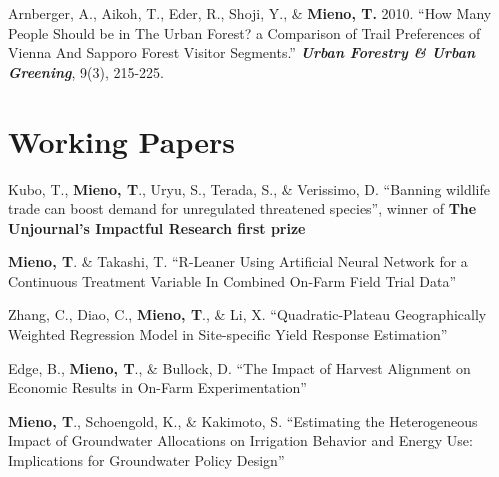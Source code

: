 \documentclass[10pt,margin,line]{res}
\newenvironment{list1}{
  \begin{list}{\ding{113}}{%
      \setlength{\itemsep}{0in}
      \setlength{\parsep}{0in} \setlength{\parskip}{0in}
      \setlength{\topsep}{0in} \setlength{\partopsep}{0in}
      \setlength{\leftmargin}{0.17in}}}{\end{list}}
\begin{document}
\begin{resume}
\begin{list1}
\item[] Arnberger, A., Aikoh, T., Eder, R., Shoji, Y., \& \textbf{Mieno, T.} 2010. ``How Many People Should be in The Urban Forest? a Comparison of Trail Preferences of Vienna And Sapporo Forest Visitor Segments.'' \textbf{\textit{Urban Forestry \& Urban Greening}}, 9(3), 215-225.
\end{list1}


\section{\sc Working Papers}

\begin{list1}

\item[] Kubo, T., \textbf{Mieno, T}., Uryu, S., Terada, S., \& Verissimo, D. ``Banning wildlife trade can boost demand for unregulated threatened species'', winner of \textbf{The Unjournal's Impactful Research first prize}
\vspace*{0.3cm}

\item[] \textbf{Mieno, T}. \& Takashi, T. ``R-Leaner Using Artificial Neural Network for a Continuous Treatment Variable In Combined On-Farm Field Trial Data''
\vspace*{0.3cm}

\item[] Zhang, C., Diao, C., \textbf{Mieno, T}., \& Li, X. ``Quadratic-Plateau Geographically Weighted Regression Model in Site-specific Yield Response Estimation''
\vspace*{0.3cm}

\item[] Edge, B., \textbf{Mieno, T}., \& Bullock, D. ``The Impact of Harvest Alignment on Economic Results in On-Farm Experimentation'' 
\vspace*{0.3cm}

\item[] \textbf{Mieno, T}., Schoengold, K., \& Kakimoto, S. ``Estimating the Heterogeneous Impact of Groundwater Allocations on Irrigation Behavior and Energy Use: Implications for Groundwater Policy Design''
\vspace*{0.3cm}


\end{list1}
\end{resume}
\end{document}
